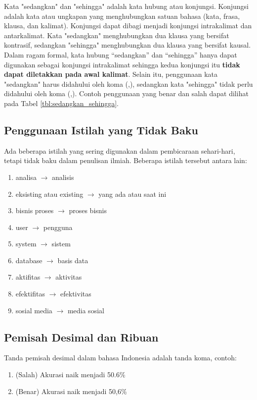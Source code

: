 \documentclass[12pt,a4paper,oneside]{book}
\begin{document}
Kata "sedangkan" dan "sehingga" adalah kata hubung atau konjungsi. 
Konjungsi adalah kata atau ungkapan yang menghubungkan satuan bahasa 
(kata, frasa, klausa, dan kalimat). 
Konjungsi dapat dibagi menjadi konjungsi intrakalimat dan antarkalimat.  
Kata "sedangkan" menghubungkan dua klausa yang bersifat kontrasif, 
sedangkan "sehingga" menghubungkan dua klausa yang bersifat kausal. 
Dalam ragam formal, kata hubung “sedangkan” dan “sehingga” hanya dapat digunakan 
sebagai konjungsi intrakalimat sehingga kedua konjungsi itu \textbf{tidak dapat diletakkan pada awal kalimat}.
Selain itu, penggunaan kata "sedangkan" harus didahului oleh koma (,), sedangkan kata "sehingga" tidak perlu didahului oleh koma (,).
Contoh penggunaan yang benar dan salah dapat dilihat pada Tabel \ref{tbl:sedangkan_sehingga}.


\subsection{Penggunaan Istilah yang Tidak Baku}
Ada beberapa istilah yang sering digunakan dalam pembicaraan sehari-hari, tetapi tidak baku dalam penulisan ilmiah.
Beberapa istilah tersebut antara lain:
\begin{enumerate}
  \item analisa $\rightarrow$ analisis
  \item eksisting atau existing $\rightarrow$ yang ada atau saat ini
  \item bisnis proses $\rightarrow$ proses bisnis
  \item user $\rightarrow$ pengguna
  \item system $\rightarrow$ sistem
  \item database $\rightarrow$ basis data
  \item aktifitas $\rightarrow$ aktivitas
  \item efektifitas $\rightarrow$ efektivitas
  \item sosial media $\rightarrow$ media sosial
\end{enumerate}

\subsection{Pemisah Desimal dan Ribuan}
Tanda pemisah desimal dalam bahasa Indonesia adalah tanda koma, contoh:
\begin{enumerate}
  \item (Salah) Akurasi naik menjadi 50.6\% 
  \item (Benar) Akurasi naik menjadi 50,6\% 
\end{enumerate}
\end{document}
